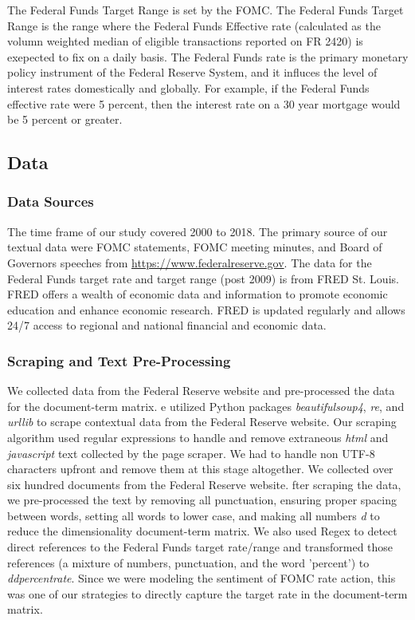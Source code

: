 \documentclass[11pt]{article}
\newcommand{\vertSpace}[1]{\vspace{3mm}}
\begin{document}
{The Federal Funds Target Range is set by the FOMC.  The Federal Funds Target Range is the range where the Federal Funds Effective rate (calculated as the volumn weighted median of eligible transactions reported on FR 2420) is exepected to fix on a daily basis.  The Federal Funds rate is the primary monetary policy instrument of the Federal Reserve System, and it influces the level of interest rates domestically and globally.  For example, if the Federal Funds effective rate were 5 percent, then the interest rate on a 30 year mortgage would be 5 percent or greater.  

\subsection{Data}

\subsubsection{Data Sources}
The time frame of our study covered 2000 to 2018.  
The primary source of our textual data were FOMC statements, FOMC meeting minutes, and Board of Governors speeches from \url{https://www.federalreserve.gov}.  
The data for the Federal Funds target rate and target range (post 2009) is from FRED St. Louis.  
FRED offers a wealth of economic data and information to promote economic education and enhance economic research. 
FRED is updated regularly and allows 24/7 access to regional and national financial and economic data.


\subsubsection{Scraping and Text Pre-Processing}

We collected data from the Federal Reserve website and pre-processed the data for the document-term matrix. \vertSpace


We utilized Python packages \textit{beautifulsoup4}, \textit{re}, and \textit{urllib} to scrape contextual data from the Federal Reserve website.  Our scraping algorithm used regular expressions to handle and remove extraneous \textit{html} and \textit{javascript} text collected by the page scraper.  We had to handle non UTF-8 characters upfront and remove them at this stage altogether.  We collected over six hundred documents from the Federal Reserve website. \vertSpace


After scraping the data, we pre-processed the text by removing all punctuation, ensuring proper spacing between words, setting all words to lower case, and making all numbers \textit{d} to reduce the dimensionality document-term matrix.  We also used Regex to detect direct references to the Federal Funds target rate/range and transformed those references (a mixture of numbers, punctuation, and the word 'percent') to \textit{ddpercentrate}.  Since we were modeling the sentiment of FOMC rate action, this was one of our strategies to directly capture the target rate in the document-term matrix. \vertSpace


}
\end{document}

